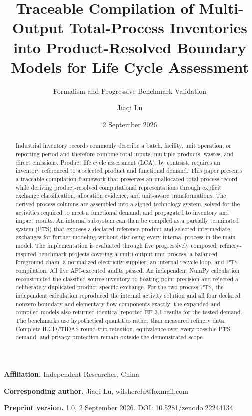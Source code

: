 \documentclass[
  10pt,
  a4paper,
  DIV=11,
  numbers=noendperiod]{scrartcl}
\title{Traceable Compilation of Multi-Output Total-Process Inventories
into Product-Resolved Boundary Models for Life Cycle Assessment}
\subtitle{Formalism and Progressive Benchmark Validation}
\author{Jiaqi Lu}
\date{2 September 2026}
\begin{document}
\maketitle
\begin{abstract}
Industrial inventory records commonly describe a batch, facility, unit
operation, or reporting period and therefore combine total inputs,
multiple products, wastes, and direct emissions. Product life cycle
assessment (LCA), by contrast, requires an inventory referenced to a
selected product and functional demand. This paper presents a traceable
compilation framework that preserves an unallocated total-process record
while deriving product-resolved computational representations through
explicit exchange classification, allocation evidence, and unit-aware
transformations. The derived process columns are assembled into a signed
technology system, solved for the activities required to meet a
functional demand, and propagated to inventory and impact results. An
internal subsystem can then be compiled as a partially terminated system
(PTS) that exposes a declared reference product and selected
intermediate exchanges for further modeling without disclosing every
internal process in the main model. The implementation is evaluated
through five progressively composed, refinery-inspired benchmark
projects covering a multi-output unit process, a balanced foreground
chain, a normalized electricity supplier, an internal recycle loop, and
PTS compilation. All five API-executed audits passed. An independent
NumPy calculation reconstructed the classified source inventory to
floating-point precision and rejected a deliberately duplicated
product-specific exchange. For the two-process PTS, the independent
calculation reproduced the internal activity solution and all four
declared nonzero boundary and elementary-flow components exactly; the
expanded and compiled models also returned identical reported EF 3.1
results for the tested demand. The benchmarks use hypothetical
quantities rather than measured refinery data. Complete ILCD/TIDAS
round-trip retention, equivalence over every possible PTS demand, and
privacy protection remain outside the demonstrated scope.
\end{abstract}


\textbf{Affiliation.} Independent Researcher, China

\textbf{Corresponding author.} Jiaqi Lu, wilsherelu@foxmail.com

\textbf{Preprint version.} 1.0, 2 September 2026. DOI:
\href{https://doi.org/10.5281/zenodo.22244134}{10.5281/zenodo.22244134}
\end{document}

